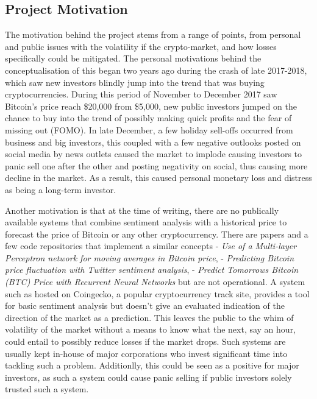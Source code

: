 \documentclass[oneside, 12pt]{article}
\begin{document}
		\subsection{Project Motivation}
		The motivation behind the project stems from a range of points, from personal and public issues with the volatility if the crypto-market, and how losses specifically could be mitigated. The personal motivations behind the conceptualisation of this began two years ago during the crash of late 2017-2018, which saw new investors blindly jump into the trend that was buying cryptocurrencies. During this period of November to December 2017 saw Bitcoin's price reach \$20,000 from \$5,000, new public investors jumped on the chance to buy into the trend of possibly making quick profits and the fear of missing out (FOMO). In late December, a few holiday sell-offs occurred from business and big investors, this coupled with a few negative outlooks posted on social media by news outlets caused the market to implode causing investors to panic sell one after the other and posting negativity on social, thus causing more decline in the market. As a result, this caused personal monetary loss and distress as being a long-term investor.
		
		Another motivation is that at the time of writing, there are no publically available systems that combine sentiment analysis with a historical price to forecast the price of Bitcoin or any other cryptocurrency. There are papers and a few code repositories that implement a similar concepts \cite{nlAeiBTCPSO} - \textit{Use of a Multi-layer Perceptron network for moving averages in Bitcoin price}, \cite{BTCFTsent} - \textit{Predicting Bitcoin price fluctuation with Twitter sentiment analysis}, \cite{BTCRNN} - \textit{Predict Tomorrows Bitcoin (BTC) Price with Recurrent Neural Networks} but are not operational. A system such as \cite{SaTdpsmm} hosted on Coingecko, a popular cryptocurrency track site, provides a tool for basic sentiment analysis but doesn't give an evaluated indication of the direction of the market as a prediction. This leaves the public to the whim of volatility of the market without a means to know what the next, say an hour, could entail to possibly reduce losses if the market drops. Such systems are usually kept in-house of major corporations who invest significant time into tackling such a problem. Additionlly, this could be seen as a positive for major investors, as such a system could cause panic selling if public investors solely trusted such a system.
			
\end{document}

